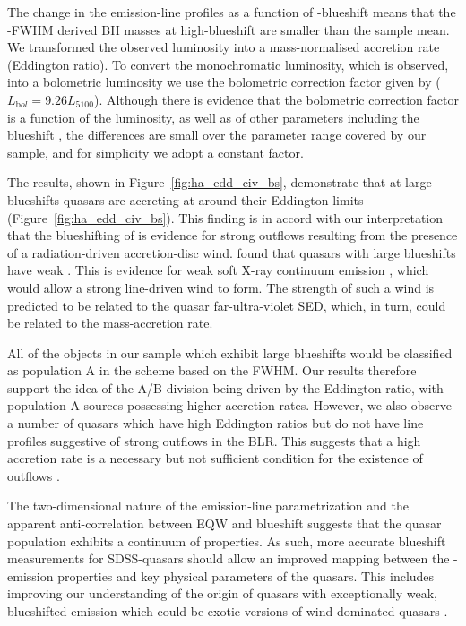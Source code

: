 The change in the \ha emission-line profiles as a function of -blueshift means that the \hans-FWHM derived BH masses at high-blueshift are smaller than the sample mean. 
We transformed the observed luminosity into a mass-normalised accretion rate (Eddington ratio).
To convert the monochromatic luminosity, which is observed, into a bolometric luminosity we use the bolometric correction factor given by \citet{richards06} ($L_{\mathrm bol} = 9.26L_{5100}$).
Although there is evidence that the bolometric correction factor is a function of the luminosity, as well as of other parameters including the  blueshift \citep{krawczyk13}, the differences are small over the parameter range covered by our sample, and for simplicity we adopt a constant factor. 

The results, shown in Figure~\ref{fig:ha_edd_civ_bs}, demonstrate that at large blueshifts quasars are accreting at around their Eddington limits (Figure~\ref{fig:ha_edd_civ_bs}). 
This finding is in accord with our interpretation that the blueshifting of  is evidence for strong outflows resulting from the presence of a radiation-driven accretion-disc wind. 
\citet{richards02} found that quasars with large  blueshifts have weak .
This is evidence for weak soft X-ray continuum emission \citep{leighly04}, which would allow a strong line-driven wind to form.  
The strength of such a wind is predicted to be related to the quasar far-ultra-violet SED, which, in turn, could be related to the mass-accretion rate.

All of the objects in our sample which exhibit large  blueshifts would be classified as population A in the \citet{sulentic00b} scheme based on the \ha FWHM. 
Our results therefore support the idea of the \citet{sulentic00b} A/B division being driven by the Eddington ratio, with population A sources possessing higher accretion rates.
However, we also observe a number of quasars which have high Eddington ratios but do not have line profiles suggestive of strong outflows in the  BLR.  
This suggests that a high accretion rate is a necessary but not sufficient condition for the existence of outflows \citep{baskin05}. 

The two-dimensional nature of the  emission-line parametrization and the apparent anti-correlation between  EQW and  blueshift suggests that the quasar population exhibits a continuum of properties. 
As such, more accurate  blueshift measurements for SDSS-quasars should allow an improved mapping between the -emission properties and key physical parameters of the quasars.
This includes improving our understanding of the origin of quasars with exceptionally weak, blueshifted  emission \citep[weak emission-line quasars;][]{luo15} which could be exotic versions of wind-dominated quasars \citep{plotkin15}.

